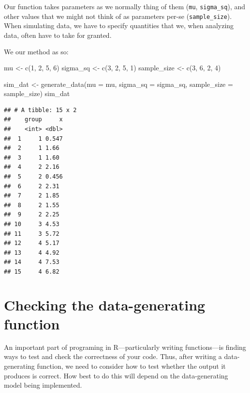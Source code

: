 \documentclass[
]{book}
\newenvironment{Shaded}{\begin{snugshade}}{\end{snugshade}}
\newcommand{\AttributeTok}[1]{\textcolor[rgb]{0.77,0.63,0.00}{#1}}
\newcommand{\DecValTok}[1]{\textcolor[rgb]{0.00,0.00,0.81}{#1}}
\newcommand{\FunctionTok}[1]{\textcolor[rgb]{0.00,0.00,0.00}{#1}}
\newcommand{\NormalTok}[1]{#1}
\newcommand{\OtherTok}[1]{\textcolor[rgb]{0.56,0.35,0.01}{#1}}
\begin{document}
Our function takes parameters as we normally thing of them (\texttt{mu}, \texttt{sigma\_sq}), and other values that we might not think of as parameters per-se (\texttt{sample\_size}).
When simulating data, we have to specify quantities that we, when analyzing data, often have to take for granted.

We our method as so:

\begin{Shaded}
\begin{Highlighting}[]
\NormalTok{mu }\OtherTok{\textless{}{-}} \FunctionTok{c}\NormalTok{(}\DecValTok{1}\NormalTok{, }\DecValTok{2}\NormalTok{, }\DecValTok{5}\NormalTok{, }\DecValTok{6}\NormalTok{)}
\NormalTok{sigma\_sq }\OtherTok{\textless{}{-}} \FunctionTok{c}\NormalTok{(}\DecValTok{3}\NormalTok{, }\DecValTok{2}\NormalTok{, }\DecValTok{5}\NormalTok{, }\DecValTok{1}\NormalTok{)}
\NormalTok{sample\_size }\OtherTok{\textless{}{-}} \FunctionTok{c}\NormalTok{(}\DecValTok{3}\NormalTok{, }\DecValTok{6}\NormalTok{, }\DecValTok{2}\NormalTok{, }\DecValTok{4}\NormalTok{)}

\NormalTok{sim\_dat }\OtherTok{\textless{}{-}} \FunctionTok{generate\_data}\NormalTok{(}\AttributeTok{mu =}\NormalTok{ mu, }
                         \AttributeTok{sigma\_sq =}\NormalTok{ sigma\_sq, }
                         \AttributeTok{sample\_size =}\NormalTok{ sample\_size)}
\NormalTok{sim\_dat}
\end{Highlighting}
\end{Shaded}

\begin{verbatim}
## # A tibble: 15 x 2
##    group     x
##    <int> <dbl>
##  1     1 0.547
##  2     1 1.66 
##  3     1 1.60 
##  4     2 2.16 
##  5     2 0.456
##  6     2 2.31 
##  7     2 1.85 
##  8     2 1.55 
##  9     2 2.25 
## 10     3 4.53 
## 11     3 5.72 
## 12     4 5.17 
## 13     4 4.92 
## 14     4 7.53 
## 15     4 6.82
\end{verbatim}

\hypertarget{checking-the-data-generating-function}{%
\section{Checking the data-generating function}\label{checking-the-data-generating-function}}

An important part of programing in R---particularly writing functions---is finding ways to test and check the correctness of your code. Thus, after writing a data-generating function, we need to consider how to test whether the output it produces is correct. How best to do this will depend on the data-generating model being implemented.
\end{document}
